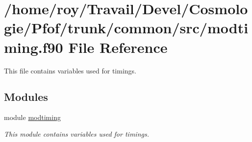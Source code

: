 \hypertarget{modtiming_8f90}{}\section{/home/roy/\+Travail/\+Devel/\+Cosmologie/\+Pfof/trunk/common/src/modtiming.f90 File Reference}
\label{modtiming_8f90}


This file contains variables used for timings.  


\subsection*{Modules}
\begin{DoxyCompactItemize}
\item 
module \hyperlink{namespacemodtiming}{modtiming}
\begin{DoxyCompactList}\small\item\em This module contains variables used for timings. \end{DoxyCompactList}\end{DoxyCompactItemize}
